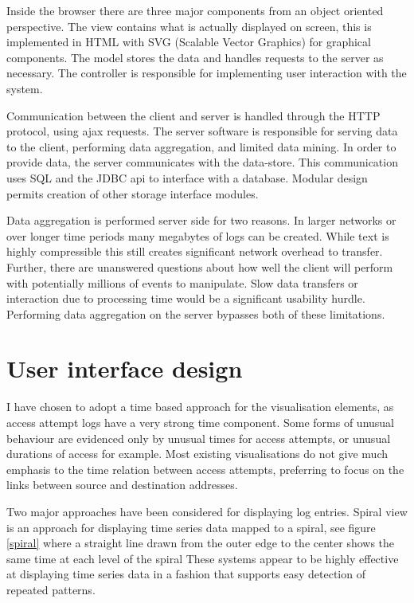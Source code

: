 Inside the browser there are three major components from an object oriented perspective. The view contains what is actually displayed on screen, this is implemented in HTML with SVG (Scalable Vector Graphics) for graphical components. The model stores the data and handles requests to the server as necessary. The controller is responsible for implementing user interaction with the system.

Communication between the client and server is handled through the HTTP protocol, using ajax requests.  The server software is responsible for serving data to the client, performing data aggregation, and limited data mining. In order to provide data, the server communicates with the data-store. This communication uses SQL and the JDBC api to interface with a database. Modular design permits creation of other storage interface modules. 

Data aggregation is performed server side for two reasons. In larger networks or over longer time periods many megabytes of logs can be created. While text is highly compressible this still creates significant network overhead to transfer. Further, there are unanswered questions about how well the client will perform with potentially millions of events to manipulate. Slow data transfers or interaction due to processing time would be a significant usability hurdle. Performing data aggregation on the server bypasses both of these limitations. 

\section{User interface design}\label{screen_design} 
  
I have chosen to adopt a time based approach for the visualisation elements, as access attempt logs have a very strong time component. Some forms of unusual behaviour are evidenced only by unusual times for access attempts, or unusual durations of access for example. Most existing visualisations do not give much emphasis to the time relation between access attempts, preferring to focus on the links between source and destination addresses. 

Two major approaches have been considered for displaying log entries.
Spiral view is an approach for displaying time series data mapped to a spiral, see figure \ref{spiral} where a straight line drawn from the outer edge to the center shows the same time at each level of the spiral \cite{bertini2007spiralview, chin2009visual}
These systems appear to be highly effective at displaying time series data in a fashion that supports easy detection of repeated patterns. 

